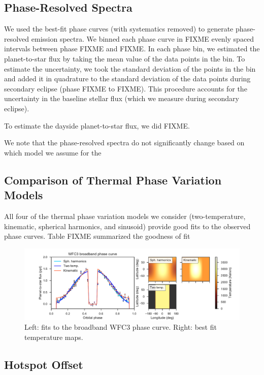 \documentclass[twocolumn]{aastex61}
\begin{document}
\subsection{Phase-Resolved Spectra}
We used the best-fit phase curves (with systematics removed) to generate phase-resolved emission spectra. We binned each phase curve in FIXME evenly spaced intervals between phase FIXME and FIXME. In each phase bin, we estimated the planet-to-star flux by taking the mean value of the data points in the bin. To estimate the uncertainty, we took the standard deviation of the points in the bin and added it in quadrature to the standard deviation of the data points during secondary eclipse (phase FIXME to FIXME). This procedure accounts for the uncertainty in the baseline stellar flux (which we measure during secondary eclipse).

To estimate the dayside planet-to-star flux, we did FIXME.

We note that the phase-resolved spectra do not significantly change based on which model we assume for the  

\subsection{Comparison of Thermal Phase Variation Models}
All four of the thermal phase variation models we consider (two-temperature, kinematic, spherical harmonics, and sinusoid) provide good fits to the observed phase curves. Table FIXME summarized the goodness of fit

\begin{figure}
\includegraphics[width = 1.0\textwidth]{Figures/hst_model_comparison.pdf}
\caption{Left: fits to the broadband WFC3 phase curve. Right: best fit temperature maps.}
\label{fig:model_comparison}
\end{figure}

\subsection{Hotspot Offset}
\end{document}
